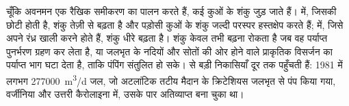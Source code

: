 चूँकि अवनमन एक रैखिक समीकरण का पालन करते हैं, कई कुओं के शंकु
जुड़ जाते हैं।  में, जिसकी  छोटी होती है, शंकु तेज़ी से बढ़ता है
और पड़ोसी कुओं के शंकु जल्दी परस्पर हस्तक्षेप करते हैं;  में,
जिसे अपने रंध्र खाली करने होते हैं, शंकु धीरे बढ़ता है। शंकु केवल तभी बढ़ना रोकता है
जब वह पर्याप्त पुनर्भरण ग्रहण कर लेता है, या जलभृत के नदियों और सोतों की ओर
होने वाले प्राकृतिक विसर्जन का पर्याप्त भाग घटा देता है, ताकि
पंपिंग संतुलित हो सके।  से बड़ी निकासियाँ दूर तक पहुँचती हैं: 1981 में
लगभग \qty{277000}{m^3/d} जल, जो अटलांटिक तटीय मैदान के क्रिटेशियस
जलभृत से पंप किया गया, वर्जीनिया और उत्तरी कैरोलाइना में, उसके पार
अतिव्याप्त  बना चुका था।


